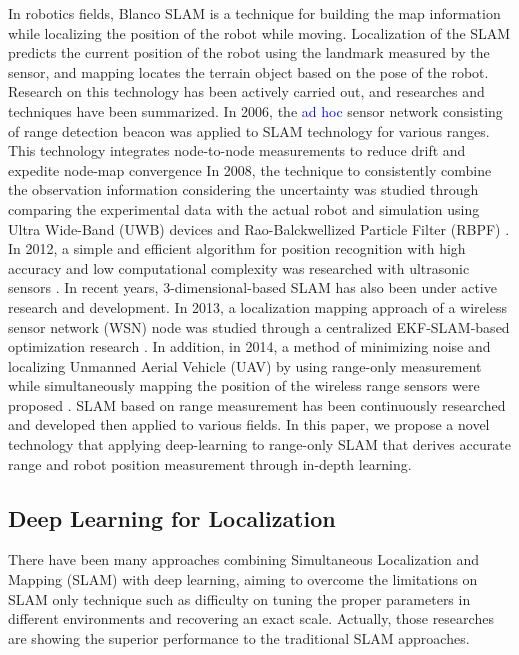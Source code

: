\documentclass{ieeeaccess}
\begin{document}
In robotics fields, Blanco SLAM is a technique for building the map information while localizing the position of the robot while moving. Localization of the SLAM predicts the current position of the robot using the landmark measured by the sensor, and mapping locates the terrain object based on the pose of the robot. Research on this technology has been actively carried out, and researches and techniques have been summarized. In 2006, the \textcolor{blue}{ad hoc} sensor network consisting of range detection beacon was applied to SLAM technology for various ranges. This technology integrates node-to-node measurements to reduce drift and expedite node-map convergence \cite{djugash2006range} In 2008, the technique to consistently combine the observation information considering the uncertainty was studied through comparing the experimental data with the actual robot and simulation using Ultra Wide-Band (UWB) devices and Rao-Balckwellized Particle Filter (RBPF) \cite{blanco2008pure}.  In 2012, a simple and efficient algorithm for position recognition with high accuracy and low computational complexity was researched with ultrasonic sensors \cite{yang2012efficient}. In recent years, 3-dimensional-based SLAM has also been under active research and development. In 2013, a localization mapping approach of a wireless sensor network (WSN) node was studied through a centralized EKF-SLAM-based optimization research \cite{fabresse2013undelayed}. In addition, in 2014, a method of minimizing noise and localizing Unmanned Aerial Vehicle (UAV) by using  range-only measurement while simultaneously mapping the position of the wireless range sensors were proposed \cite{fabresse2014robust}. 
SLAM based on range measurement has been continuously researched and developed then applied to various fields. In this paper, we propose a novel technology that applying deep-learning to range-only SLAM that derives accurate range and robot position measurement through in-depth learning. 




\subsection{Deep Learning for Localization}
There have been many approaches combining Simultaneous Localization and Mapping (SLAM) with deep learning, aiming to overcome the limitations on SLAM only technique such as difficulty on tuning the proper parameters in different environments and recovering an exact scale. Actually, those researches are showing the superior performance to the traditional SLAM approaches.
\end{document}
